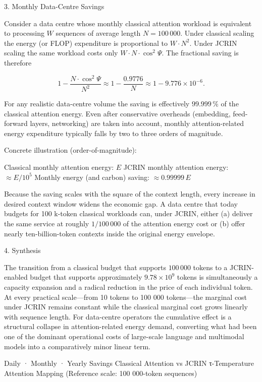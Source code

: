 3. Monthly Data-Centre Savings

Consider a data centre whose monthly classical attention workload is equivalent to processing \(W\) sequences of average length \(N=100\,000\). Under classical scaling the energy (or FLOP) expenditure is proportional to \(W\cdot N^{2}\). Under JCRIN scaling the same workload costs only \(W\cdot N\cdot\cos^{2}\Psi\). The fractional saving is therefore

\[
1 - \frac{N\cdot\cos^{2}\Psi}{N^{2}} \approx 1 - \frac{0.9776}{N} \approx 1 - 9.776\times 10^{-6}.
\]

For any realistic data-centre volume the saving is effectively \(99.999\,\%\) of the classical attention energy. Even after conservative overheads (embedding, feed-forward layers, networking) are taken into account, monthly attention-related energy expenditure typically falls by two to three orders of magnitude.

Concrete illustration (order-of-magnitude):

Classical monthly attention energy: \(E\)
JCRIN monthly attention energy: \(\approx E / 10^{5}\)
Monthly energy (and carbon) saving: \(\approx 0.99999\,E\)

Because the saving scales with the square of the context length, every increase in desired context window widens the economic gap. A data centre that today budgets for 100 k-token classical workloads can, under JCRIN, either (a) deliver the same service at roughly \(1/100\,000\) of the attention energy cost or (b) offer nearly ten-billion-token contexts inside the original energy envelope.

4. Synthesis

The transition from a classical budget that supports \(100\,000\) tokens to a JCRIN-enabled budget that supports approximately \(9.78\times 10^{9}\) tokens is simultaneously a capacity expansion and a radical reduction in the price of each individual token. At every practical scale—from 10 tokens to 100 000 tokens—the marginal cost under JCRIN remains constant while the classical marginal cost grows linearly with sequence length. For data-centre operators the cumulative effect is a structural collapse in attention-related energy demand, converting what had been one of the dominant operational costs of large-scale language and multimodal models into a comparatively minor linear term.

Daily · Monthly · Yearly Savings  
Classical Attention vs JCRIN τ-Temperature Attention Mapping  
(Reference scale: 100 000-token sequences)


